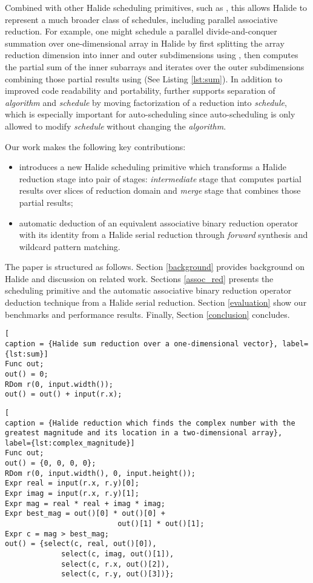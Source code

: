 Combined with other Halide scheduling primitives, such as , this allows Halide to represent a much broader class of schedules, including parallel associative reduction. For example, one might schedule a parallel divide-and-conquer summation over one-dimensional array in Halide by first splitting the array reduction dimension into inner and outer subdimensions using , then computes the partial sum of the inner subarrays and iterates over the outer subdimensions combining those partial results using  (See Listing \ref{lst:sum}). In addition to improved code readability and portability,  further supports separation of \emph{algorithm} and \emph{schedule} by moving factorization of a reduction into \emph{schedule}, which is especially important for auto-scheduling \cite{Mullapudi:2016:ASH:2897824.2925952} since auto-scheduling is only allowed to modify \emph{schedule} without changing the \emph{algorithm}.

Our work makes the following key contributions:
\begin{itemize}
  \item introduces a new Halide scheduling primitive  which transforms a Halide reduction stage into pair of stages: \emph{intermediate} stage that computes partial results over slices of reduction domain and \emph{merge} stage that combines those partial results;
  \item automatic deduction of an equivalent associative binary reduction operator with its identity from a Halide serial reduction through \emph{forward} synthesis and wildcard pattern matching.
\end{itemize}	

The paper is structured as follows. Section \ref{background} provides background on Halide and discussion on related work. Sections \ref{assoc_red} presents the  scheduling primitive and the automatic associative binary reduction operator deduction technique from a Halide serial reduction. Section \ref{evaluation} show our benchmarks and performance results. Finally, Section \ref{conclusion} concludes.

\begin{lstlisting}[
caption = {Halide sum reduction over a one-dimensional vector}, label={lst:sum}]
Func out;
out() = 0;
RDom r(0, input.width());
out() = out() + input(r.x);
\end{lstlisting}

\begin{lstlisting}[
caption = {Halide reduction which finds the complex number with the greatest magnitude and its location in a two-dimensional array}, label={lst:complex_magnitude}]
Func out;
out() = {0, 0, 0, 0};
RDom r(0, input.width(), 0, input.height());
Expr real = input(r.x, r.y)[0];
Expr imag = input(r.x, r.y)[1];
Expr mag = real * real + imag * imag;
Expr best_mag = out()[0] * out()[0] + 
                          out()[1] * out()[1];
Expr c = mag > best_mag;
out() = {select(c, real, out()[0]),
             select(c, imag, out()[1]),
             select(c, r.x, out()[2]),
             select(c, r.y, out()[3])};
\end{lstlisting}